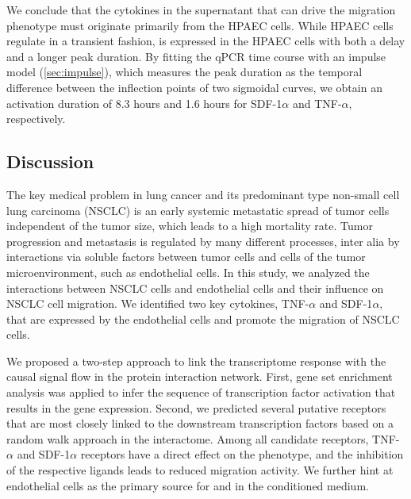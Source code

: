 We conclude that the cytokines in the supernatant that can drive the migration
phenotype
must originate primarily from the HPAEC cells.  
While HPAEC cells regulate \tnfa in a transient fashion,
\sdfonea is expressed in the HPAEC cells with both a delay and a longer peak duration.
By fitting the qPCR time course with an impulse model 
(\ref{sec:impulse}), which measures the peak 
duration as the 
temporal difference between the inflection points of two
sigmoidal curves, 
we obtain an activation duration of  8.3 hours and 1.6 hours for SDF-1$\alpha$
and TNF-$\alpha$, respectively.

\clearpage
\subsection{Discussion}

The key medical problem in lung cancer and its predominant type non-small 
cell lung carcinoma (NSCLC) is an early systemic metastatic spread of tumor cells 
independent of the tumor size, which leads to a high mortality rate. Tumor progression 
and metastasis is regulated by many different processes, inter alia by interactions 
via soluble factors between tumor cells and cells of the tumor microenvironment, such as 
endothelial cells. In this study, we analyzed the interactions between NSCLC cells 
and endothelial cells and their influence on NSCLC cell migration. We identified 
two key cytokines, TNF-$\alpha$ and SDF-1$\alpha$, that are expressed by the 
endothelial cells and promote the migration of NSCLC cells.

We proposed a two-step approach to link the transcriptome response
with the causal signal flow in the protein interaction network. First, gene set
enrichment analysis was applied to infer the sequence of transcription factor
activation that results in the gene expression. Second, we predicted several
putative receptors that are most closely linked to the downstream transcription
factors based on 
a random walk approach in the interactome. Among all candidate receptors,
TNF-$\alpha$ and SDF-1$\alpha$ receptors have a direct effect on the phenotype,
and the inhibition of the respective ligands leads to reduced migration 
activity. We further
hint at endothelial cells as the primary source for \tnfa and \sdfonea in the conditioned medium.

